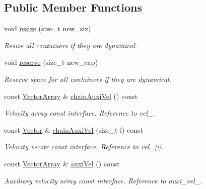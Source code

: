 \subsection*{Public Member Functions}
\begin{DoxyCompactItemize}
\item 
void \mbox{\hyperlink{class_space_h_1_1_vel_dep_chain_particles_a8cc7751b890724be0bf72471cb65d761}{resize}} (size\+\_\+t new\+\_\+siz)
\begin{DoxyCompactList}\small\item\em Resize all containers if they are dynamical. \end{DoxyCompactList}\item 
void \mbox{\hyperlink{class_space_h_1_1_vel_dep_chain_particles_a0257a89d0e3058624cc076c2956b94ea}{reserve}} (size\+\_\+t new\+\_\+cap)
\begin{DoxyCompactList}\small\item\em Reserve space for all containers if they are dynamical. \end{DoxyCompactList}\item 
const \mbox{\hyperlink{class_space_h_1_1_vel_indep_particles_aa9983058940249df8b00fa800e8cbad2}{Vector\+Array}} \& \mbox{\hyperlink{class_space_h_1_1_vel_dep_chain_particles_ab2ec7493ee6cb12ed77f6aac4f4e8660}{chain\+Auxi\+Vel}} () const
\begin{DoxyCompactList}\small\item\em Velocity array const interface. Reference to vel\+\_\+. \end{DoxyCompactList}\item 
const \mbox{\hyperlink{class_space_h_1_1_vel_indep_particles_a61bbcfdb0dc7f99f3c68af69a755c935}{Vector}} \& \mbox{\hyperlink{class_space_h_1_1_vel_dep_chain_particles_a1f717dd8619e3237362bacd55623500c}{chain\+Auxi\+Vel}} (size\+\_\+t i) const
\begin{DoxyCompactList}\small\item\em Velocity vecotr const interface. Reference to vel\+\_\+\mbox{[}i\mbox{]}. \end{DoxyCompactList}\item 
const \mbox{\hyperlink{class_space_h_1_1_vel_indep_particles_aa9983058940249df8b00fa800e8cbad2}{Vector\+Array}} \& \mbox{\hyperlink{class_space_h_1_1_vel_dep_chain_particles_a36387410e94b04978444b572da9f9104}{auxi\+Vel}} () const
\begin{DoxyCompactList}\small\item\em Auxiliary velocity array const interface. Reference to auxi\+\_\+vel\+\_\+. \end{DoxyCompactList}\item 

\end{DoxyCompactItemize}
